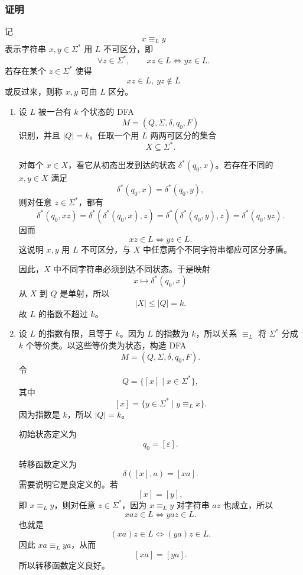 \begin{answerred}
\subsubsection*{证明}

记
\[
    x\equiv_L y
\]
表示字符串 $x,y\in\Sigma^*$ 用 $L$ 不可区分，即
\[
    \forall z\in\Sigma^*,\qquad xz\in L\iff yz\in L.
\]
若存在某个 $z\in\Sigma^*$ 使得
\[
    xz\in L,\ yz\notin L
\]
或反过来，则称 $x,y$ 可由 $L$ 区分。

\begin{enumerate}[label=(\alph*), leftmargin=2.5em]
    \item 设 $L$ 被一台有 $k$ 个状态的 DFA
    \[
        M=(Q,\Sigma,\delta,q_0,F)
    \]
    识别，并且 $|Q|=k$。任取一个用 $L$ 两两可区分的集合
    \[
        X\subseteq\Sigma^*.
    \]

    对每个 $x\in X$，看它从初态出发到达的状态 $\delta^*(q_0,x)$。若存在不同的 $x,y\in X$ 满足
    \[
        \delta^*(q_0,x)=\delta^*(q_0,y),
    \]
    则对任意 $z\in\Sigma^*$，都有
    \[
        \delta^*(q_0,xz)
        =
        \delta^*(\delta^*(q_0,x),z)
        =
        \delta^*(\delta^*(q_0,y),z)
        =
        \delta^*(q_0,yz).
    \]
    因而
    \[
        xz\in L\iff yz\in L.
    \]
    这说明 $x,y$ 用 $L$ 不可区分，与 $X$ 中任意两个不同字符串都应可区分矛盾。

    因此，$X$ 中不同字符串必须到达不同状态。于是映射
    \[
        x\longmapsto \delta^*(q_0,x)
    \]
    从 $X$ 到 $Q$ 是单射，所以
    \[
        |X|\le |Q|=k.
    \]
    故 $L$ 的指数不超过 $k$。

    \item 设 $L$ 的指数有限，且等于 $k$。因为 $L$ 的指数为 $k$，所以关系 $\equiv_L$ 将 $\Sigma^*$ 分成 $k$ 个等价类。以这些等价类为状态，构造 DFA
    \[
        M=(Q,\Sigma,\delta,q_0,F).
    \]
    令
    \[
        Q=\{[x]\mid x\in\Sigma^*\},
    \]
    其中
    \[
        [x]=\{y\in\Sigma^*\mid y\equiv_L x\}.
    \]
    因为指数是 $k$，所以 $|Q|=k$。

    初始状态定义为
    \[
        q_0=[\varepsilon].
    \]

    转移函数定义为
    \[
        \delta([x],a)=[xa].
    \]
    需要说明它是良定义的。若
    \[
        [x]=[y],
    \]
    即 $x\equiv_L y$，则对任意 $z\in\Sigma^*$，因为 $x\equiv_L y$ 对字符串 $az$ 也成立，所以
    \[
        xaz\in L\iff yaz\in L.
    \]
    也就是
    \[
        (xa)z\in L\iff (ya)z\in L.
    \]
    因此 $xa\equiv_L ya$，从而
    \[
        [xa]=[ya].
    \]
    所以转移函数定义良好。


\end{enumerate}
\end{answerred}
